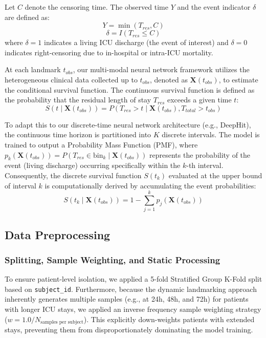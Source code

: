\documentclass[10pt, a4paper]{article}
\begin{document}
Let $C$ denote the censoring time. The observed time $Y$ and the event indicator $\delta$ are defined as:
\begin{equation}
    Y = \min(T_{res}, C)
\end{equation}
\begin{equation}
    \delta = I(T_{res} \le C)
\end{equation}
where $\delta = 1$ indicates a living ICU discharge (the event of interest) and $\delta = 0$ indicates right-censoring due to in-hospital or intra-ICU mortality.

At each landmark $t_{obs}$, our multi-modal neural network framework utilizes the heterogeneous clinical data collected up to $t_{obs}$, denoted as $\mathbf{X}(t_{obs})$, to estimate the conditional survival function. The continuous survival function is defined as the probability that the residual length of stay $T_{res}$ exceeds a given time $t$:
\begin{equation}
    S(t \mid \mathbf{X}(t_{obs})) = P(T_{res} > t \mid \mathbf{X}(t_{obs}), T_{total} > t_{obs})
\end{equation}

To adapt this to our discrete-time neural network architecture (e.g., DeepHit), the continuous time horizon is partitioned into $K$ discrete intervals. The model is trained to output a Probability Mass Function (PMF), where $p_k(\mathbf{X}(t_{obs})) = P(T_{res} \in \text{bin}_k \mid \mathbf{X}(t_{obs}))$ represents the probability of the event (living discharge) occurring specifically within the $k$-th interval. Consequently, the discrete survival function $S(t_k)$ evaluated at the upper bound of interval $k$ is computationally derived by accumulating the event probabilities:
\begin{equation}
    S(t_k \mid \mathbf{X}(t_{obs})) = 1 - \sum_{j=1}^{k} p_j(\mathbf{X}(t_{obs}))
\end{equation}

\subsection{Data Preprocessing}
\subsubsection{Splitting, Sample Weighting, and Static Processing}
To ensure patient-level isolation, we applied a 5-fold Stratified Group K-Fold split based on \texttt{subject\_id}. Furthermore, because the dynamic landmarking approach inherently generates multiple samples (e.g., at 24h, 48h, and 72h) for patients with longer ICU stays, we applied an inverse frequency sample weighting strategy ($w = 1.0 / N_{\text{samples per subject}}$). This explicitly down-weights patients with extended stays, preventing them from disproportionately dominating the model training. 
\end{document}
